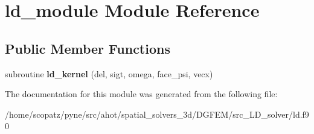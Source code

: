 \hypertarget{classld__module}{\section{ld\-\_\-module Module Reference}
\label{classld__module}
}
\subsection*{Public Member Functions}
\begin{DoxyCompactItemize}
\item 
\hypertarget{classld__module_a7b1e55ba9bbc02396f0a489ad630cfde}{subroutine {\bfseries ld\-\_\-kernel} (del, sigt, omega, face\-\_\-psi, vecx)}\label{classld__module_a7b1e55ba9bbc02396f0a489ad630cfde}

\end{DoxyCompactItemize}


The documentation for this module was generated from the following file\-:\begin{DoxyCompactItemize}
\item 
/home/scopatz/pyne/src/ahot/spatial\-\_\-solvers\-\_\-3d/\-D\-G\-F\-E\-M/src\-\_\-\-L\-D\-\_\-solver/ld.\-f90\end{DoxyCompactItemize}

